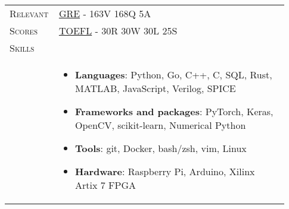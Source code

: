 \documentclass[letterpaper, 10pt, oneside]{article}
\newcommand{\stitle}[1]{\normalsize{\textsc{#1}}}
\newcommand{\bdit}[1]{{\textbf{#1}}}
\begin{document}
\begin{longtable}{@{} p{0.13\linewidth} p{0.8\linewidth}}
    \stitle{Relevant}    & \href{https://drive.google.com/file/d/1GcdXmPTWR-6tKUgB92V8pG8GVn-ng_6C}{GRE} \hspace{3mm} - 163V 168Q 5A                                                                                                         \\[0.3ex]
    \stitle{Scores}      & \href{https://drive.google.com/file/d/1lHDbt59e9o1LFKb_HhWiVbzITH7avB6j}{TOEFL} - 30R 30W 30L 25S                                                                                                                 \\

    \newpage
    \stitle{Skills}      &                                                                                                                                                                                                                   \\[-2.34ex]
                         & \parbox{0.8\textwidth}{                                                                                                                                                                                           %
        \begin{itemize}[leftmargin=0ex, itemsep=-0.4ex, topsep=-2ex, label={}]
            \item \bdit{Languages}:               Python, Go, C++, C, SQL, Rust, MATLAB, JavaScript, Verilog, SPICE
            \item \bdit{Frameworks and packages}: PyTorch, Keras, OpenCV, scikit-learn, Numerical Python
            \item \bdit{Tools}:                   git, Docker, bash/zsh, vim, Linux
            \item \bdit{Hardware}:                Raspberry Pi, Arduino, Xilinx Artix 7 FPGA
        \end{itemize}
    }
    \\
    \\[1ex]



\end{longtable}
\end{document}
